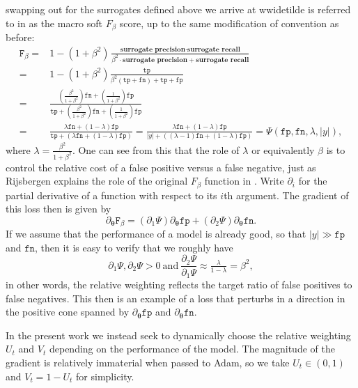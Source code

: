 \documentclass[10pt,a4paper]{article}
\begin{document}
swapping out for the surrogates defined above we arrive at wwidetilde is referred to in \cite{lee2021surrogate} as the macro soft $F_\beta$ score, up to the same modification of convention as before:
\begin{align*}
\texttt F_\beta=&1-(1+\beta^2)\frac{\textbf{surrogate precision}\cdot\textbf{surrogate recall}}{\beta^2\cdot\textbf{surrogate precision}+\textbf{surrogate recall}}\\
=&1-(1+\beta^2)\frac{\texttt{tp}}{\beta^2(\texttt{tp}+\texttt{fn})+\texttt{tp}+\texttt{fp}}\\
  =&\frac{\left(\tfrac{\beta^2}{1+\beta^2}\right)\texttt{fn}+\left(\tfrac1{1+\beta^2}\right)\texttt{fp}}{\texttt{tp}+\left(\tfrac{\beta^2}{1+\beta^2}\right)\texttt{fn}+\left(\tfrac1{1+\beta^2}\right)\texttt{fp}}\\
  =&\frac{\lambda\texttt{fn}+(1-\lambda)\texttt{fp}}{\texttt{tp}+\left(\lambda\texttt{fn}+(1-\lambda)\texttt{fp}\right)}=\frac{\lambda\texttt{fn}+(1-\lambda)\texttt{fp}}{|y|+\left((\lambda-1)\texttt{fn}+(1-\lambda)\texttt{fp}\right)}=\Psi(\texttt{fp},\texttt{fn},\lambda,|y|),
\end{align*}
where $\lambda=\tfrac{\beta^2}{1+\beta^2}$.
One can see from this that the role of $\lambda$ or equivalently $\beta$ is to control the relative cost of a false positive versus a false negative, just as Rijsbergen explains the role of the original $F_\beta$ function in \cite{van1979information}.
Write $\partial_i$ for the partial derivative of a function with respect to its $i$th argument.
The gradient of this loss then is given by
$$
\partial_{\boldsymbol\theta}\texttt{F}_\beta=(\partial_1\Psi)\partial_{\boldsymbol\theta}\texttt{fp}+(\partial_2\Psi)\partial_{\boldsymbol\theta}\texttt{fn}.
$$
If we assume that the performance of a model is already good, so that $|y|\gg\texttt{fp}$ and $\texttt{fn}$, then it is easy to verify that we roughly have
$$
\partial_1\Psi,\partial_2\Psi>0~\text{and}~\frac{\partial_2\Psi}{\partial_1\Psi}\approx\tfrac\lambda{1-\lambda}=\beta^2,
$$
in other words, the relative weighting reflects the target ratio of false positives to false negatives.
This then is an example of a loss that perturbs in a direction in the positive cone spanned by $\partial_{\boldsymbol\theta}\texttt{fp}$ and $\partial_{\boldsymbol\theta}\texttt{fn}$.

In the present work we instead seek to dynamically choose the relative weighting $U_t$ and $V_t$ depending on the performance of the model.
The magnitude of the gradient is relatively immaterial when passed to Adam, so we take $U_t\in(0,1)$ and $V_t=1-U_t$ for simplicity.
\end{document}
